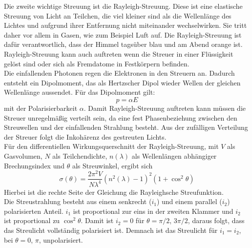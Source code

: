\documentclass[.../bericht]{subfilies}
\begin{document}
      Die zweite wichtige Streuung ist die Rayleigh-Streuung. Diese ist eine elastische Streuung von Licht an Teilchen, die viel kleiner sind als die Wellenlänge des Lichtes und aufgrund ihrer Entfernung nicht miteinander wechselwirken. Sie tritt daher vor allem in Gasen, wie zum Beispiel Luft auf. Die Rayleigh-Streuung ist dafür verantwortlich, dass der Himmel tagsüber blau und am Abend orange ist. Rayleigh-Streuung kann auch auftreten wenn die Streuer in einer Flüssigkeit gelöst sind oder sich als Fremdatome in Festkörpern befinden. \\
      Die einfallenden Photonen regen die Elektronen in den Streuern an. Dadurch entsteht ein Dipolmoment, das als Hertzscher Dipol wieder Wellen der gleichen Wellenlänge aussendet. Für das Dipolmoment gilt:
      \begin{equation}
        p=\alpha E
        \label{eq:dipol}
      \end{equation}
      mit der Polarisierbarkeit $\alpha$. Damit Rayleigh-Streuung auftreten kann müssen die Streuer unregelmäßig verteilt sein, da eine fest Phasenbeziehung zwischen den Streuwellen und der einfallenden Strahlung besteht. Aus der zufälligen Verteilung der Streuer folgt die Inkohärenz des gestreuten Lichts. \\
      Für den differentiellen Wirkungsquerschnitt der Rayleigh-Streuung, mit $V$ als Gasvolumen, $N$ als Teilchendichte, $n(\lambda)$ als Wellenlängen abhängiger Brechungsindex und $\theta$ als Streuwinkel, ergibt sich
      \begin{equation}
        \sigma(\theta)=\frac{2\pi^2 V}{N\lambda^4}(n^2(\lambda)-1)^2(1+\cos^2\theta)
        \label{eq:streuquerschnitt}
      \end{equation}
      Hierbei ist die rechte Seite der Gleichung die Rayleighsche Streufunktion. \\

      Die Streustrahlung besteht aus einem senkrecht ($i_1$) und einem parallel ($i_2$) polarisierten Anteil. $i_1$ ist proportional zur eins in der zweiten Klammer und $i_2$ ist proportional zu $\cos^2\theta$. Damit ist $i_2=0$ für $\theta=\pi/2$, $3\pi/2$, daraus folgt, dass das Streulicht vollständig polarisiert ist. Demnach ist das Streulicht für $i_1=i_2$, bei $\theta=0$, $\pi$, unpolarisiert.
\end{document}

